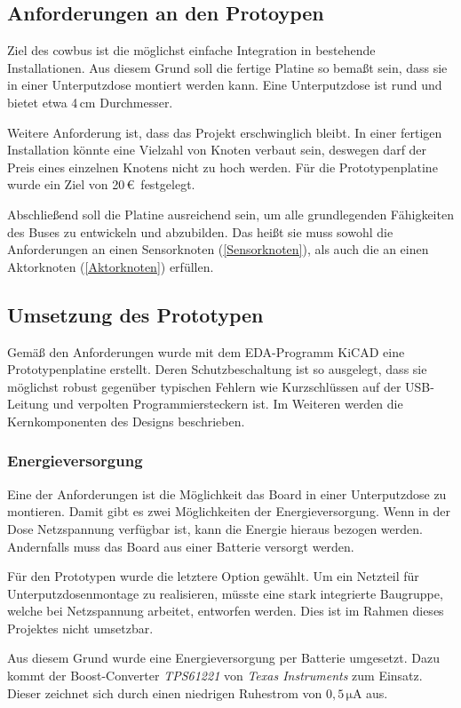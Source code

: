 \documentclass{IEEEtran}
\begin{document}
\subsection{Anforderungen an den Protoypen}
Ziel des cowbus ist die möglichst einfache Integration in bestehende Installationen.
Aus diesem Grund soll die fertige Platine so bemaßt sein, dass sie in einer Unterputzdose montiert werden kann.
Eine Unterputzdose ist rund und bietet etwa 4\,cm Durchmesser.

Weitere Anforderung ist, dass das Projekt erschwinglich bleibt.
In einer fertigen Installation könnte eine Vielzahl von Knoten verbaut sein, deswegen darf der Preis eines einzelnen Knotens nicht zu hoch werden.
Für die Prototypenplatine wurde ein Ziel von 20\,\euro\ festgelegt.

Abschließend soll die Platine ausreichend sein, um alle grundlegenden Fähigkeiten des Buses zu entwickeln und abzubilden.
Das heißt sie muss sowohl die Anforderungen an einen Sensorknoten (\ref{Sensorknoten}), als auch die an einen Aktorknoten (\ref{Aktorknoten}) erfüllen.

\subsection{Umsetzung des Prototypen}
Gemäß den Anforderungen wurde mit dem EDA-Programm KiCAD eine Prototypenplatine erstellt.
Deren Schutzbeschaltung ist so ausgelegt, dass sie möglichst robust gegenüber typischen Fehlern wie Kurzschlüssen auf der USB-Leitung und verpolten Programmiersteckern ist.
Im Weiteren werden die Kernkomponenten des Designs beschrieben.

\subsubsection{Energieversorgung}
Eine der Anforderungen ist die Möglichkeit das Board in einer Unterputzdose zu montieren.
Damit gibt es zwei Möglichkeiten der Energieversorgung.
Wenn in der Dose Netzspannung verfügbar ist, kann die Energie hieraus bezogen werden.
Andernfalls muss das Board aus einer Batterie versorgt werden.

Für den Prototypen wurde die letztere Option gewählt.
Um ein Netzteil für Unterputzdosenmontage zu realisieren, müsste eine stark integrierte Baugruppe, welche bei Netzspannung arbeitet, entworfen werden.
Dies ist im Rahmen dieses Projektes nicht umsetzbar.

Aus diesem Grund wurde eine Energieversorgung per Batterie umgesetzt.
Dazu kommt der Boost-Converter \emph{TPS61221} von \emph{Texas Instruments} zum Einsatz.
Dieser zeichnet sich durch einen niedrigen Ruhestrom von $0,5 \, \mathrm{\mu A}$ aus.
\end{document}
